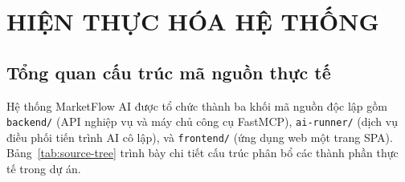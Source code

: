 \chapter{HIỆN THỰC HÓA HỆ THỐNG}

\section{Tổng quan cấu trúc mã nguồn thực tế}

Hệ thống MarketFlow AI được tổ chức thành ba khối mã nguồn độc lập gồm \texttt{backend/} (API nghiệp vụ và máy chủ công cụ FastMCP), \texttt{ai-runner/} (dịch vụ điều phối tiến trình AI cô lập), và \texttt{frontend/} (ứng dụng web một trang SPA). Bảng~\ref{tab:source-tree} trình bày chi tiết cấu trúc phân bổ các thành phần thực tế trong dự án.

